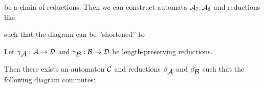 be a chain of reductions. Then we can construct automata $\mbox{$\mathcal{A}$}_7, \mbox{$\mathcal{A}$}_8$
and reductions like

\begin{center}
\end{center}

such that the diagram can be ''shortened'' to

\begin{center}
\end{center}

\begin{lemma}
Let $\gamma_{\mbox{$\mathcal{A}$}} : \mbox{$\mathcal{A}$} \to \mbox{$\mathcal{D}$}$ and $\gamma_{\mbox{$\mathcal{B}$}} : \mbox{$\mathcal{B}$} \to
\mbox{$\mathcal{D}$}$ be length-preserving reductions.

Then there exists an automaton $\mbox{$\mathcal{C}$}$ and reductions $\beta_{\mbox{$\mathcal{A}$}}$ and
$\beta_{\mbox{$\mathcal{B}$}}$ such that the following diagram commutes:
\begin{center}
\end{center}
\end{lemma}

